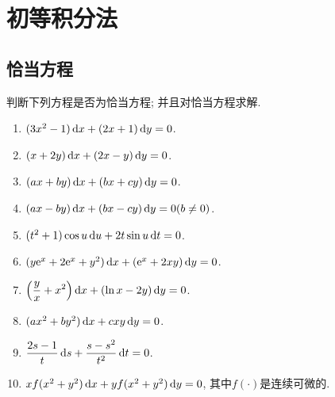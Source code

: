 \chapter{初等积分法}



\section{恰当方程}



\begin{exercise}
  判断下列方程是否为恰当方程; 并且对恰当方程求解.
  \begin{enumerate}[(1)]
  \item $(3x^2-1)\mathop{}\!\mathrm{d} x+(2x+1)\mathop{}\!\mathrm{d} y=0$.
  \item $(x+2y)\mathop{}\!\mathrm{d} x+(2x-y)\mathop{}\!\mathrm{d} y=0$.
  \item $(ax+by)\mathop{}\!\mathrm{d} x+(bx+cy)\mathop{}\!\mathrm{d} y=0$.
  \item $(ax-by)\mathop{}\!\mathrm{d} x+(bx-cy)\mathop{}\!\mathrm{d} y=0(b\neq0)$.
  \item $(t^2+1)\cos u\mathop{}\!\mathrm{d} u+2t\sin u\mathop{}\!\mathrm{d} t=0$.
  \item $(y\mathrm{e}^x+2\mathrm{e}^x+y^2)\mathop{}\!\mathrm{d} x+(\mathrm{e}^x+2xy)\mathop{}\!\mathrm{d} y=0$.
  \item $\displaystyle\left(\frac{y}{x}+x^2\right)\mathop{}\!\mathrm{d} x+(\ln x-2y)\mathop{}\!\mathrm{d} y=0$.
  \item $(ax^2+by^2)\mathop{}\!\mathrm{d} x+cxy\mathop{}\!\mathrm{d} y=0$.
  \item $\displaystyle\frac{2s-1}{t}\mathop{}\!\mathrm{d} s+\frac{s-s^2}{t^2}\mathop{}\!\mathrm{d} t=0$.
  \item $xf(x^2+y^2)\mathop{}\!\mathrm{d} x+yf(x^2+y^2)\mathop{}\!\mathrm{d} y=0$, 其中$f(\cdot)$是连续可微的.
  \end{enumerate}
\end{exercise}

